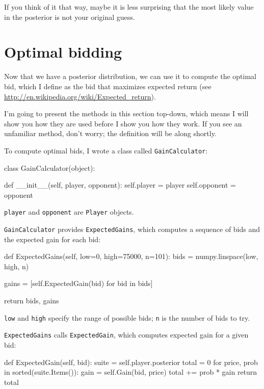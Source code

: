 \documentclass[12pt]{book}
\theoremstyle{exercise}
\begin{document}
If you think of it that way, maybe it is less surprising that the
most likely value in the posterior is not your original guess.


\section{Optimal bidding}

Now that we have a posterior distribution, we can use it to
compute the optimal bid, which I define as the bid that maximizes
expected return (see \url{http://en.wikipedia.org/wiki/Expected_return}).

I'm going to present the methods in this section top-down, which
means I will show you how they are used before I show you how they
work.  If you see an unfamiliar method, don't worry; the definition
will be along shortly.

To compute optimal bids, I wrote a class called {\tt GainCalculator}:

\begin{code}
class GainCalculator(object):

    def __init__(self, player, opponent):
        self.player = player
        self.opponent = opponent
\end{code}

{\tt player} and {\tt opponent} are {\tt Player} objects.

{\tt GainCalculator} provides {\tt ExpectedGains}, which
computes a sequence of bids and the expected gain for each
bid:

\begin{code}
    def ExpectedGains(self, low=0, high=75000, n=101):
        bids = numpy.linspace(low, high, n)

        gains = [self.ExpectedGain(bid) for bid in bids]

        return bids, gains
\end{code}

{\tt low} and {\tt high} specify the range of possible bids;
{\tt n} is the number of bids to try.  

{\tt ExpectedGains} calls {\tt ExpectedGain}, which
computes expected gain for a given bid:

\begin{code}
    def ExpectedGain(self, bid):
        suite = self.player.posterior
        total = 0
        for price, prob in sorted(suite.Items()):
            gain = self.Gain(bid, price)
            total += prob * gain
        return total
\end{code}
\end{document}
